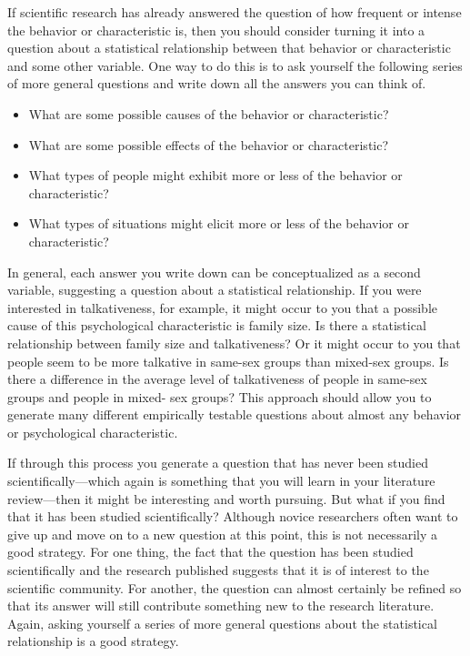 \documentclass[]{book}
\theoremstyle{definition}
\theoremstyle{definition}
\theoremstyle{remark}
\begin{document}
If scientific research has already answered the question of how frequent
or intense the behavior or characteristic is, then you should consider
turning it into a question about a statistical relationship between that
behavior or characteristic and some other variable. One way to do this
is to ask yourself the following series of more general questions and
write down all the answers you can think of.

\begin{itemize}
\item
  What are some possible causes of the behavior or characteristic?
\item
  What are some possible effects of the behavior or characteristic?
\item
  What types of people might exhibit more or less of the behavior or
  characteristic?
\item
  What types of situations might elicit more or less of the behavior or
  characteristic?
\end{itemize}

In general, each answer you write down can be conceptualized as a second
variable, suggesting a question about a statistical relationship. If you
were interested in talkativeness, for example, it might occur to you
that a possible cause of this psychological characteristic is family
size. Is there a statistical relationship between family size and
talkativeness? Or it might occur to you that people seem to be more
talkative in same-sex groups than mixed-sex groups. Is there a
difference in the average level of talkativeness of people in same-sex
groups and people in mixed- sex groups? This approach should allow you
to generate many different empirically testable questions about almost
any behavior or psychological characteristic.

If through this process you generate a question that has never been
studied scientifically---which again is something that you will learn in
your literature review---then it might be interesting and worth
pursuing. But what if you find that it has been studied scientifically?
Although novice researchers often want to give up and move on to a new
question at this point, this is not necessarily a good strategy. For one
thing, the fact that the question has been studied scientifically and
the research published suggests that it is of interest to the scientific
community. For another, the question can almost certainly be refined so
that its answer will still contribute something new to the research
literature. Again, asking yourself a series of more general questions
about the statistical relationship is a good strategy.
\end{document}
